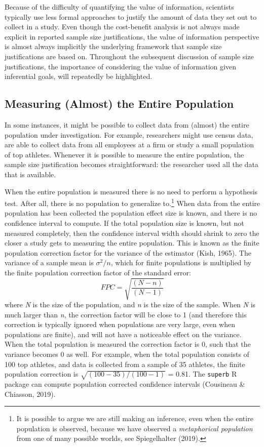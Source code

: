 \documentclass[
  english,
  ,jou, a4paper,floatsintext]{apa6}
\begin{document}
Because of the difficulty of quantifying the value of information, scientists typically use less formal approaches to justify the amount of data they set out to collect in a study. Even though the cost-benefit analysis is not always made explicit in reported sample size justifications, the value of information perspective is almost always implicitly the underlying framework that sample size justifications are based on. Throughout the subsequent discussion of sample size justifications, the importance of considering the value of information given inferential goals, will repeatedly be highlighted.

\hypertarget{measuring-almost-the-entire-population}{%
\subsection{Measuring (Almost) the Entire Population}\label{measuring-almost-the-entire-population}}

In some instances, it might be possible to collect data from (almost) the entire population under investigation. For example, researchers might use census data, are able to collect data from all employees at a firm or study a small population of top athletes. Whenever it is possible to measure the entire population, the sample size justification becomes straightforward: the researcher used all the data that is available.

When the entire population is measured there is no need to perform a hypothesis test. After all, there is no population to generalize to.\footnote{It is possible to argue we are still making an inference, even when the entire population is observed, because we have observed a \emph{metaphorical population} from one of many possible worlds, see Spiegelhalter (2019).} When data from the entire population has been collected the population effect size is known, and there is no confidence interval to compute. If the total population size is known, but not measured completely, then the confidence interval width should shrink to zero the closer a study gets to measuring the entire population. This is known as the finite population correction factor for the variance of the estimator (Kish, 1965). The variance of a sample mean is \(\sigma^2/n\), which for finite populations is multiplied by the finite population correction factor of the standard error:
\[FPC = \sqrt{\frac{(N - n)}{(N-1)}}\]
where \emph{N} is the size of the population, and \emph{n} is the size of the sample. When \emph{N} is much larger than \emph{n}, the correction factor will be close to 1 (and therefore this correction is typically ignored when populations are very large, even when populations are finite), and will not have a noticeable effect on the variance. When the total population is measured the correction factor is 0, such that the variance becomes 0 as well. For example, when the total population consists of 100 top athletes, and data is collected from a sample of 35 athletes, the finite population correction is \(\sqrt{(100 - 35)/(100-1)}\) = 0.81. The \texttt{superb} R package can compute population corrected confidence intervals (Cousineau \& Chiasson, 2019).
\end{document}
